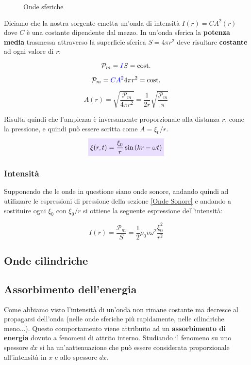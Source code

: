 \documentclass[x11names]{article}
\newcommand{\incfig}[1]{%
	\def\svgwidth{\columnwidth}
	{#1.pdf_tex}
}
\newcommand{\viola}[1]{\colorbox{myred}{$\displaystyle #1$}}
\begin{document}
	\begin{figure}[ht]
		\centering
		\scalebox{.7}{\incfig{sfera}}
		\caption{Onde sferiche}
		\label{fig:Onde sferiche}
	\end{figure}
	
	\noindent
	Diciamo che la nostra sorgente emetta un'onda di intensità \(I(r) = CA^2(r)\) dove \(C\) è una costante dipendente dal mezzo. In un'onda sferica la \textbf{potenza media} trasmessa attraverso la superficie sferica \(S = 4\pi r^2\) deve risultare \textbf{costante} ad ogni valore di \(r\):
	
	\[ 
	\mathcal{P}_m = \textcolor{blue}{I}S = \text{cost.}
	\] 
	
	\[ 
	\mathcal{P}_m = \textcolor{blue}{CA^2}4\pi r^2 = \text{cost.}
	\]
	
	\[ 
	A(r) = \sqrt{\frac{\mathcal{P}_m}{4\pi r^2}} = \frac{1}{2r}\sqrt{\frac{\mathcal{P}_m}{\pi}}
	\]

	\noindent
	Risulta quindi che l'ampiezza è inversamente proporzionale alla distanza \(r\), come la pressione, e quindi può essere scritta come \(A = \xi_0 /r\).
	\begin{equation}
		\viola{\xi(r,t) = \frac{\xi_0}{r}\sin\left(kr -\omega t\right)}
	\end{equation}
	
	\subsubsection{Intensità}
	Supponendo che le onde in questione siano onde sonore, andando quindi ad utilizzare le espressioni di pressione della sezione \ref{Onde Sonore} e andando a sostituire ogni \(\xi_0\) con \(\xi_0/r\) si ottiene la seguente espressione dell'intensità:
	
	\[ 
	I(r) = \frac{\mathcal{P}_m}{S} = \frac{1}{2} \rho_0 v \omega ^2 \frac{\xi_0^2}{r^2}
	\]
	
	\subsection{Onde cilindriche}
	


	\newpage
	\subsection{Assorbimento dell'energia}
	Come abbiamo visto l'intensità di un'onda non rimane costante ma decresce al propagarsi dell'onda (nelle onde sferiche più rapidamente, nelle cilindriche meno...). Questo comportamento viene attribuito ad un \textbf{assorbimento di energia} dovuto a fenomeni di attrito interno. Studiando il fenomeno su uno spessore \(dx\) si ha un'aattenuazione che può essere considerata proporzionale all'intensità in \(x\) e allo spessore \(dx\).
	
\end{document}
